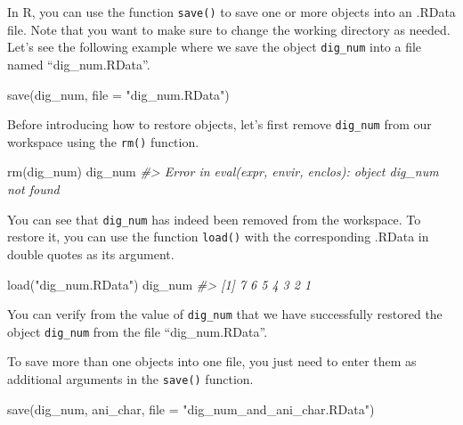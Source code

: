 \documentclass[
]{book}
\newenvironment{Shaded}{\begin{snugshade}}{\end{snugshade}}
\newcommand{\AttributeTok}[1]{\textcolor[rgb]{0.77,0.63,0.00}{#1}}
\newcommand{\CommentTok}[1]{\textcolor[rgb]{0.56,0.35,0.01}{\textit{#1}}}
\newcommand{\FunctionTok}[1]{\textcolor[rgb]{0.00,0.00,0.00}{#1}}
\newcommand{\NormalTok}[1]{#1}
\newcommand{\StringTok}[1]{\textcolor[rgb]{0.31,0.60,0.02}{#1}}
\begin{document}
In R, you can use the function \texttt{save()} to save one or more objects into an .RData file. Note that you want to make sure to change the working directory as needed. Let's see the following example where we save the object \texttt{dig\_num} into a file named ``dig\_num.RData''.

\begin{Shaded}
\begin{Highlighting}[]
\FunctionTok{save}\NormalTok{(dig\_num, }\AttributeTok{file =} \StringTok{"dig\_num.RData"}\NormalTok{)}
\end{Highlighting}
\end{Shaded}

Before introducing how to restore objects, let's first remove \texttt{dig\_num} from our workspace using the \texttt{rm()} function.

\begin{Shaded}
\begin{Highlighting}[]
\FunctionTok{rm}\NormalTok{(dig\_num)}
\NormalTok{dig\_num}
\CommentTok{\#\textgreater{} Error in eval(expr, envir, enclos): object \textquotesingle{}dig\_num\textquotesingle{} not found}
\end{Highlighting}
\end{Shaded}

You can see that \texttt{dig\_num} has indeed been removed from the workspace. To restore it, you can use the function \texttt{load()} with the corresponding .RData in double quotes as its argument.

\begin{Shaded}
\begin{Highlighting}[]
\FunctionTok{load}\NormalTok{(}\StringTok{"dig\_num.RData"}\NormalTok{)}
\NormalTok{dig\_num}
\CommentTok{\#\textgreater{} [1] 7 6 5 4 3 2 1}
\end{Highlighting}
\end{Shaded}

You can verify from the value of \texttt{dig\_num} that we have successfully restored the object \texttt{dig\_num} from the file ``dig\_num.RData''.

To save more than one objects into one file, you just need to enter them as additional arguments in the \texttt{save()} function.

\begin{Shaded}
\begin{Highlighting}[]
\FunctionTok{save}\NormalTok{(dig\_num, ani\_char, }\AttributeTok{file =} \StringTok{"dig\_num\_and\_ani\_char.RData"}\NormalTok{)}
\end{Highlighting}
\end{Shaded}
\end{document}
